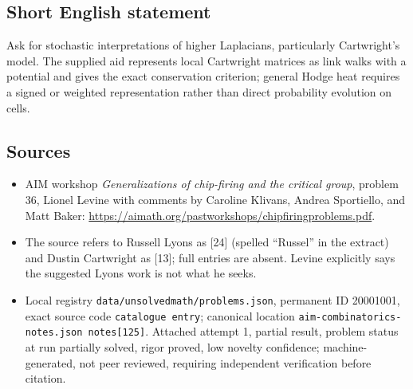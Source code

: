 \documentclass[11pt]{article}
\begin{document}
\subsection{Short English statement}
Ask for stochastic interpretations of higher Laplacians, particularly Cartwright's model. The supplied aid represents local Cartwright matrices as link walks with a potential and gives the exact conservation criterion; general Hodge heat requires a signed or weighted representation rather than direct probability evolution on cells.
\subsection{Sources}
\begin{itemize}
\item AIM workshop \emph{Generalizations of chip-firing and the critical group}, problem 36, Lionel Levine with comments by Caroline Klivans, Andrea Sportiello, and Matt Baker: \url{https://aimath.org/pastworkshops/chipfiringproblems.pdf}.
\item The source refers to Russell Lyons as [24] (spelled ``Russel'' in the extract) and Dustin Cartwright as [13]; full entries are absent. Levine explicitly says the suggested Lyons work is not what he seeks.
\item Local registry \texttt{data/unsolvedmath/problems.json}, permanent ID 20001001, exact source code \texttt{catalogue entry}; canonical location \texttt{aim-combinatorics-notes.json notes[125]}. Attached attempt 1, partial result, problem status at run partially solved, rigor proved, low novelty confidence; machine-generated, not peer reviewed, requiring independent verification before citation.
\end{itemize}
\end{document}
